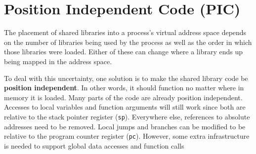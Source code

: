 \documentclass[12pt]{ucsddissertation}
\begin{document}
%
%


\section{Position Independent Code (PIC)} \label{bg-pic}

The placement of shared libraries into a process's virtual address space depends on the number of libraries being used by the process as well as the order in which those libraries were loaded. Either of these can change where a library ends up being mapped in the address space. 

 
To deal with this uncertainty, one solution is to make the shared library code be \textbf{position independent}. In other words, it should function no matter where in memory it is loaded. Many parts of the code are already position independent. Accesses to local variables and function arguments will still work since both are relative to the stack pointer register (\texttt{sp}). Everywhere else, references to absolute addresses need to be removed. Local jumps and branches can be modified to be relative to the program counter register (\texttt{pc}). However, some extra infrastructure is needed to support global data accesses and function calls

\end{document}
